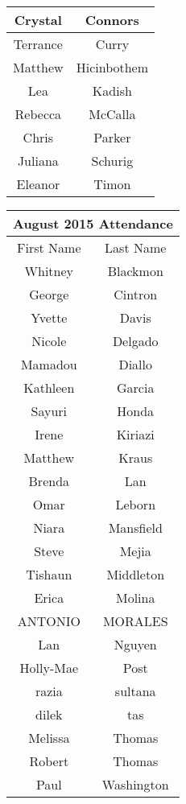 \documentclass[12pt,dvipsnames]{article}
\begin{document}
\begin{table}
\begin{tabular}{|c|c|}
 		\hline
 		Crystal  & Connors\\ 
 		\hline
 		Terrance & Curry\\ 
 		\hline
 		Matthew  & Hicinbothem\\ 
 		\hline
 		Lea  & Kadish\\ 
 		\hline
 		Rebecca  & McCalla\\ 
 		\hline
 		Chris  & Parker\\ 
 		\hline
 		Juliana  & Schurig\\ 
 		\hline
 		Eleanor  & Timon\\ 
 		\hline\end{tabular}
 \hfill
	\begin{tabular}{|c|c|}
 		 		\multicolumn{2}{c}{\bfseries August 2015 Attendance}\\\hline
 		First Name & Last Name\\ 
 		\hline
 		Whitney & Blackmon\\ 
 		\hline
 		George & Cintron\\ 
 		\hline
 		Yvette & Davis\\ 
 		\hline
 		Nicole & Delgado\\ 
 		\hline
 		Mamadou & Diallo\\ 
 		\hline
 		Kathleen & Garcia\\ 
 		\hline
 		Sayuri & Honda\\ 
 		\hline
 		Irene & Kiriazi\\ 
 		\hline
 		Matthew & Kraus\\ 
 		\hline
 		Brenda & Lan\\ 
 		\hline
 		Omar & Leborn\\ 
 		\hline
 		Niara & Mansfield\\ 
 		\hline
 		Steve & Mejia\\ 
 		\hline
 		Tishaun & Middleton\\ 
 		\hline
 		Erica & Molina\\ 
 		\hline
 		ANTONIO & MORALES\\ 
 		\hline
 		Lan & Nguyen\\ 
 		\hline
 		Holly-Mae  & Post\\ 
 		\hline
 		razia & sultana\\ 
 		\hline
 		dilek & tas\\ 
 		\hline
 		Melissa & Thomas\\ 
 		\hline
 		Robert & Thomas\\ 
 		\hline
 		Paul & Washington\\ 
 		\hline\end{tabular}
 
 \end{table}
 
 
\end{document}
